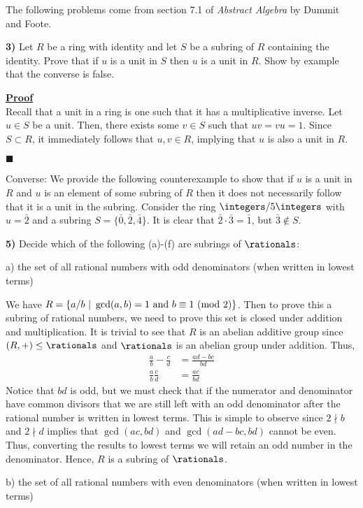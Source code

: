 \documentclass[12pt,a4paper]{article}
\newcommand{\prob}[2]{\textbf{#1)} #2}
\newenvironment{proof}
{
\textbf{\underline{Proof}} \\
}
{
\begin{flushright}
$\blacksquare$
\end{flushright}}
\begin{document}
The following problems come from section 7.1 of \textit{Abstract Algebra} by Dummit and Foote.

\prob{3}{Let $R$ be a ring with identity and let $S$ be a subring of $R$ containing the identity. Prove that if $u$ is a unit in $S$ then $u$ is a unit in $R$. Show by example that the converse is false.}

\begin{proof}
Recall that a unit in a ring is one such that it has a multiplicative inverse. Let $u \in S$ be a unit. Then, there exists some $v \in S$ such that $uv = vu = 1$. Since $S \subset R$, it immediately follows that $u,v \in R$, implying that $u$ is also a unit in $R$.
\end{proof}

Converse: We provide the following counterexample to show that if $u$ is a unit in $R$ and $u$ is an element of some subring of $R$ then it does not necessarily follow that it is a unit in the subring. Consider the ring $\integers/5\integers$ with $u = \bar{2}$ and a subring $S = \{\bar{0},\bar{2},\bar{4}\}$. It is clear that $\bar{2} \cdot \bar{3} = \bar{1}$, but $\bar{3} \not\in S$.

\prob{5}{Decide which of the following (a)-(f) are subrings of $\rationals$:}

a) the set of all rational numbers with odd denominators (when written in lowest terms)

We have $R = \{a/b ~ | ~ \gcd(a,b) = 1 \text{ and } b \equiv 1 ~({\rm mod} ~ 2)\}$. Then to prove this a subring of rational numbers, we need to prove this set is closed under addition and multiplication. It is trivial to see that $R$ is an abelian additive group since $(R,+) \leq \rationals$ and $\rationals$ is an abelian group under addition. Thus,
\begin{align*}
\frac{a}{b} - \frac{c}{d} &= \frac{ad - bc}{bd} \\
\frac{a}{b}\frac{c}{d} &= \frac{ac}{bd}
\end{align*}
Notice that $bd$ is odd, but we must check that if the numerator and denominator have common divisors that we are still left with an odd denominator after the rational number is written in lowest terms. This is simple to observe since $2 \nmid b$ and $2 \nmid d$ implies that $\gcd(ac,bd)$ and $\gcd(ad-bc,bd)$ cannot be even. Thus, converting the results to lowest terms we will retain an odd number in the denominator. Hence, $R$ is a subring of $\rationals$.

b) the set of all rational numbers with even denominators (when written in lowest terms)
\end{document}
